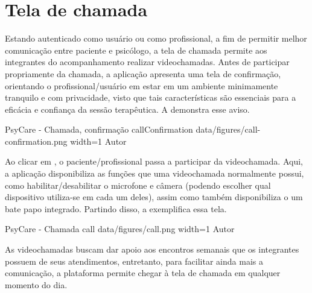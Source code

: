 \section{Tela de chamada}
\label{sec:chamada}

Estando autenticado como usuário ou como profissional, a fim de permitir melhor comunicação entre paciente e psicólogo, a tela de chamada permite aos integrantes do acompanhamento realizar videochamadas. Antes de participar propriamente da chamada, a aplicação apresenta uma tela de confirmação, orientando o profissional/usuário em estar em um ambiente minimamente tranquilo e com privacidade, visto que tais características são essenciais para a eficácia e confiança da sessão terapêutica. A  demonstra esse aviso.

\image
    {PsyCare - Chamada, confirmação}
    {callConfirmation}
    {data/figures/call-confirmation.png}
    {width=1\textwidth}
    {Autor}

Ao clicar em , o paciente/profissional passa a participar da videochamada. Aqui, a aplicação disponibiliza as funções que uma videochamada normalmente possui, como habilitar/desabilitar o microfone e câmera (podendo escolher qual dispositivo utiliza-se em cada um deles), assim como também disponibiliza o um bate papo integrado. Partindo disso, a  exemplifica essa tela.

\image
    {PsyCare - Chamada}
    {call}
    {data/figures/call.png}
    {width=1\textwidth}
    {Autor}

As videochamadas buscam dar apoio aos encontros semanais que os integrantes possuem de seus atendimentos, entretanto, para facilitar ainda mais a comunicação, a plataforma permite chegar à tela de chamada em qualquer momento do dia. 